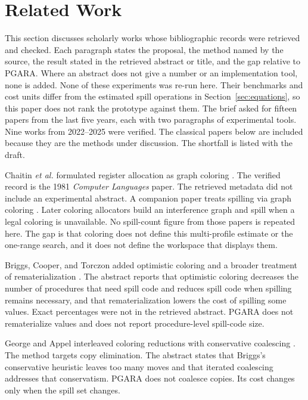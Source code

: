 \documentclass{ieeeaccess}
\begin{document}
\section{Related Work}
\label{sec:related}
This section discusses scholarly works whose bibliographic records were retrieved and checked.
Each paragraph states the proposal, the method named by the source, the result stated in the retrieved abstract or title, and the gap relative to PGARA.
Where an abstract does not give a number or an implementation tool, none is added.
None of these experiments was re-run here.
Their benchmarks and cost units differ from the estimated spill operations in Section~\ref{sec:equations}, so this paper does not rank the prototype against them.
The brief asked for fifteen papers from the last five years, each with two paragraphs of experimental tools.
Nine works from 2022--2025 were verified.
The classical papers below are included because they are the methods under discussion.
The shortfall is listed with the draft.

Chaitin \emph{et al.} formulated register allocation as graph coloring \cite{chaitin1981}.
The verified record is the 1981 \emph{Computer Languages} paper.
The retrieved metadata did not include an experimental abstract.
A companion paper treats spilling via graph coloring \cite{chaitin1982}.
Later coloring allocators build an interference graph and spill when a legal coloring is unavailable.
No spill-count figure from those papers is repeated here.
The gap is that coloring does not define this multi-profile estimate or the one-range search, and it does not define the workspace that displays them.

Briggs, Cooper, and Torczon added optimistic coloring and a broader treatment of rematerialization \cite{briggs1994}.
The abstract reports that optimistic coloring decreases the number of procedures that need spill code and reduces spill code when spilling remains necessary, and that rematerialization lowers the cost of spilling some values.
Exact percentages were not in the retrieved abstract.
PGARA does not rematerialize values and does not report procedure-level spill-code size.

George and Appel interleaved coloring reductions with conservative coalescing \cite{george1996}.
The method targets copy elimination.
The abstract states that Briggs's conservative heuristic leaves too many moves and that iterated coalescing addresses that conservatism.
PGARA does not coalesce copies.
Its cost changes only when the spill set changes.
\end{document}
